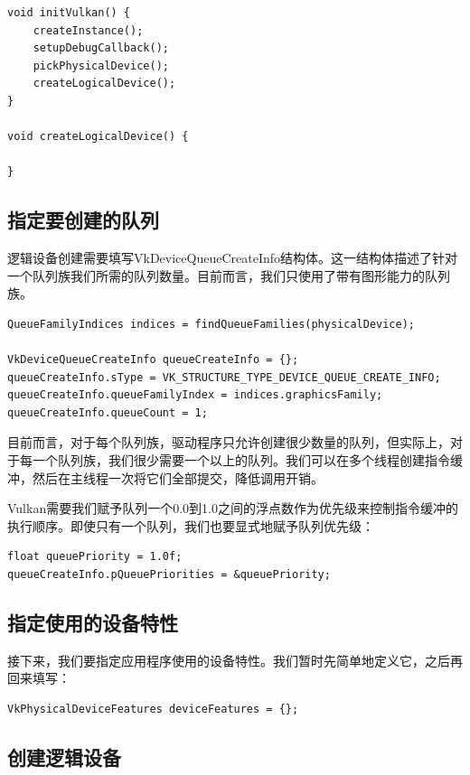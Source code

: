 \documentclass{ctexart}
\begin{document}
\begin{lstlisting}[language={[ANSI]C}]
void initVulkan() {
	createInstance();
	setupDebugCallback();
	pickPhysicalDevice();
	createLogicalDevice();
}

void createLogicalDevice() {

}
\end{lstlisting}

\subsection{指定要创建的队列}

逻辑设备创建需要填写VkDeviceQueueCreateInfo结构体。这一结构体描述了针对一个队列族我们所需的队列数量。目前而言，我们只使用了带有图形能力的队列族。

\begin{lstlisting}[language={[ANSI]C}]
QueueFamilyIndices indices = findQueueFamilies(physicalDevice);

VkDeviceQueueCreateInfo queueCreateInfo = {};
queueCreateInfo.sType = VK_STRUCTURE_TYPE_DEVICE_QUEUE_CREATE_INFO;
queueCreateInfo.queueFamilyIndex = indices.graphicsFamily;
queueCreateInfo.queueCount = 1;
\end{lstlisting}

目前而言，对于每个队列族，驱动程序只允许创建很少数量的队列，但实际上，对于每一个队列族，我们很少需要一个以上的队列。我们可以在多个线程创建指令缓冲，然后在主线程一次将它们全部提交，降低调用开销。

Vulkan需要我们赋予队列一个0.0到1.0之间的浮点数作为优先级来控制指令缓冲的执行顺序。即使只有一个队列，我们也要显式地赋予队列优先级：

\begin{lstlisting}[language={[ANSI]C}]
float queuePriority = 1.0f;
queueCreateInfo.pQueuePriorities = &queuePriority;
\end{lstlisting}

\subsection{指定使用的设备特性}

接下来，我们要指定应用程序使用的设备特性。我们暂时先简单地定义它，之后再回来填写：

\begin{lstlisting}[language={[ANSI]C}]
VkPhysicalDeviceFeatures deviceFeatures = {};
\end{lstlisting}

\subsection{创建逻辑设备}
\end{document}
